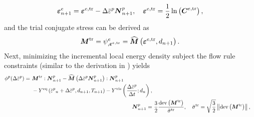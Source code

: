 \begin{align}
  \strain^e_{n+1} = \strain^{e,\text{tr}} - \Delta\ep\bfN^p_{n+1}, \quad \strain^{e,\text{tr}} = \dfrac{1}{2}\ln\left( \bfC^{e,\text{tr}} \right),
\end{align}
and the trial conjugate stress can be derived as
\begin{align}
  \boldsymbol{M}^\text{tr} = \psi^e_{,\boldsymbol{\varepsilon}^{e,\text{tr}}} = \widehat{\boldsymbol{M}}\left( \boldsymbol{\varepsilon}^{e,\text{tr}}, d_{n+1} \right).
\end{align}
Next, minimizing the incremental local energy density subject the flow rule constraints (similar to the derivation in ) yields
\begin{subequations}
  \begin{align}
    \begin{split}
      \phi^p(\Delta\ep) = &\ \bfM^\text{tr}:\bfN^p_{n+1} - \widehat{\bfM}\left( \Delta\ep \bfN^p_{n+1} \right):\bfN^p_{n+1} \\
      &\ - Y^\text{eq}\left( \ep_n + \Delta\ep, d_{n+1}, T_{n+1} \right) - Y^\text{vis}\left( \dfrac{\Delta \ep}{\Delta t}; d_{n} \right) ,
    \end{split}                                                                                                                                                                      \\
    \bfN^p_{n+1} = & \  \dfrac{3}{2} \dfrac{\dev\left( \bfM^\text{tr} \right)}{\bar{\sigma}^\text{tr}}, \quad \bar{\sigma}^\text{tr} = \sqrt{\dfrac{3}{2}}\norm{\dev\left( \bfM^\text{tr} \right)}, 
  \end{align}
\end{subequations}
